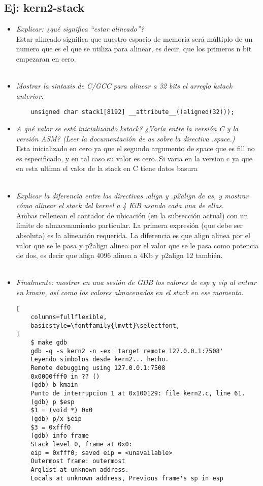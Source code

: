\documentclass[a4paper, 12pt]{article}
\begin{document}
		\subsection{Ej: kern2-stack}
		\begin{itemize}
			\item \textit{Explicar: ¿qué significa “estar alineado”?\\}
		Estar alineado significa que nuestro espacio de memoria será
		múltiplo de un numero que es el que se utiliza para alinear, es decir,
		que los primeros n bit empezaran en cero.\\\\
			\item \textit{Mostrar la sintaxis de C/GCC para alinear a 32 bits
			el arreglo kstack anterior.\\}
\begin{lstlisting}
	unsigned char stack1[8192] __attribute__((aligned(32)));
\end{lstlisting}
			\item \textit{A qué valor se está inicializando kstack?
			¿Varía entre la versión C y la versión ASM? (Leer la documentación
			de as sobre la directiva .space.)\\}
		Esta inicializado en cero ya que el segundo argumento de space que es
		fill no es especificado, y en tal caso su valor es cero. Si varia en la
		version c ya que en esta ultima el valor de la stack en C tiene datos
		basura\\\\
			\item \textit{Explicar la diferencia entre las directivas .align y
			.p2align de as, y mostrar cómo alinear el stack del kernel a 4 KiB
			usando cada una de ellas.\\}
		Ambas rellenean el contador de ubicación (en la subsección actual) con
		un límite de almacenamiento particular. La primera expresión
		(que debe ser absoluta) es la alineación requerida. La diferencia es que
		align alinea por el valor que se le pasa y p2align alinea por el valor
		que se le pasa como potencia de dos, es decir que align 4096 alinea a
		4Kb y p2align 12 también.\\\\
			\item \textit{Finalmente: mostrar en una sesión de GDB los valores
			de esp y eip al entrar en kmain, así como los valores almacenados
			en el stack en ese momento.\\}
\begin{lstlisting}[
	columns=fullflexible,
	basicstyle=\fontfamily{lmvtt}\selectfont,
]
	$ make gdb
	gdb -q -s kern2 -n -ex 'target remote 127.0.0.1:7508'
	Leyendo simbolos desde kern2... hecho.
	Remote debugging using 127.0.0.1:7508
	0x0000fff0 in ?? ()
	(gdb) b kmain
	Punto de interrupcion 1 at 0x100129: file kern2.c, line 61.
	(gdb) p $esp
	$1 = (void *) 0x0
	(gdb) p/x $eip
	$3 = 0xfff0
	(gdb) info frame
	Stack level 0, frame at 0x0:
	eip = 0xfff0; saved eip = <unavailable>
	Outermost frame: outermost
	Arglist at unknown address.
	Locals at unknown address, Previous frame's sp in esp
\end{lstlisting}
		\end{itemize}
\end{document}
